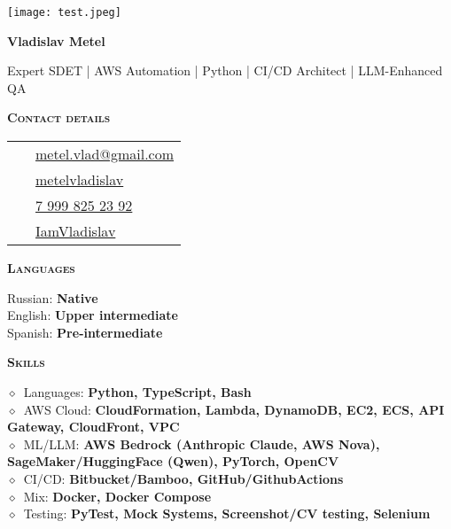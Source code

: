 \documentclass[10pt, a4paper]{article}
\newcommand{\normal}[1]{{\normalsize$\diamond$\ #1}}
\newcommand{\headleft}[1]{\vspace*{2ex}\textsc{\textbf{#1}}\par%
	\vspace*{-1.5ex}\hrulefill\par\vspace*{0.7ex}}
\begin{document}
	
	\setlength{\topskip}{0pt}
	\setlength{\parindent}{0pt}
	\setlength{\parskip}{0pt}
	\setlength{\fboxsep}{0pt}
	\pagestyle{empty}
	\raggedbottom
	
	\begin{minipage}[t]{0.33\textwidth} %
		\colorbox{cvblue!90}{\color{white}  %
			\textwidth\relax%
			\begin{minipage}[t][297mm][t]{0.82\textwidth}
				\raggedright
				\vspace*{2ex} %
				\null\hfill\texttt{[image: test.jpeg]}\hfill\null

				
				\vspace*{1.5ex}
				
				\Large  \textbf{Vladislav Metel} \normalsize 
				
				\vspace*{1.5ex}
				
				Expert SDET | AWS Automation | Python | CI/CD Architect | LLM-Enhanced QA
				
				\headleft{Contact details}
				
				\begin{tabular}{ @{}c l }
					\Letter\ & \href{mailto:metel.vlad@gmail.com?subject=Job Opportunity}{metel.vlad@gmail.com} \\
					\faLinkedin\ & \href{https://www.linkedin.com/in/metelvladislav}{metelvladislav} \\
					\faMobile*\ & \href{tel:+7 999 825 23 92}{\raisebox{0.2ex}{+}7 999 825 23 92} \\
					\faGithub\ & \href{https://github.com/IamVladislav}{IamVladislav} \\
				\end{tabular}
				
				\headleft{Languages}
				Russian: \textbf{Native} \\[2pt]
				English: \textbf{Upper intermediate} \\[2pt]
				Spanish: \textbf{Pre-intermediate}
				
				
				\headleft{Skills}
				\normal{Languages: \textbf{Python, TypeScript, Bash}} \\[1pt]
				\normal{AWS Cloud: \textbf{CloudFormation, Lambda, DynamoDB, EC2, ECS, API Gateway, CloudFront, VPC}} \\[1pt]
				\normal{ML/LLM: \textbf{AWS Bedrock (Anthropic Claude, AWS Nova), SageMaker/HuggingFace (Qwen), PyTorch, OpenCV}} \\[1pt]
				\normal{CI/CD: \textbf{Bitbucket/Bamboo, GitHub/GithubActions}} \\[1pt]
				\normal{Mix: \textbf{Docker, Docker Compose}} \\[1pt]
				\normal{Testing: \textbf{PyTest, Mock Systems, Screenshot/CV testing, Selenium}}
				

\end{minipage}}
\end{minipage}
\end{document}
